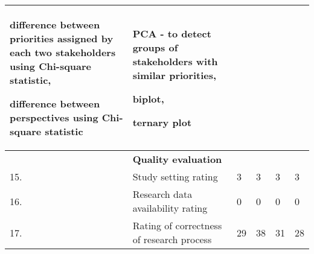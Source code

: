 \begin{table}
{\begin{tabular}{|>{\raggedright}p{}|>{\raggedright}p{}|>{\raggedright}p{}|>{\raggedright}p{}|>{\raggedright}p{}|>{\raggedright}p{}|}
difference between priorities assigned  by each two stakeholders using Chi-square statistic,

difference between perspectives using Chi-square statistic

&
PCA - to detect groups of stakeholders with similar priorities,

biplot,

ternary plot 
& \tabularnewline
\hline 
 & \textbf{Quality evaluation} &  &  &  & \tabularnewline
\hline 
15. & Study setting rating & 3 & 3 & 3 & 3\tabularnewline
\hline 
16. & Research data availability rating & 0 & 0 & 0 & 0\tabularnewline
\hline 
17. & Rating of correctness of research process & 29 & 38 & 31  & 28\tabularnewline
\hline
\end{tabular}%
}
\end{table}

